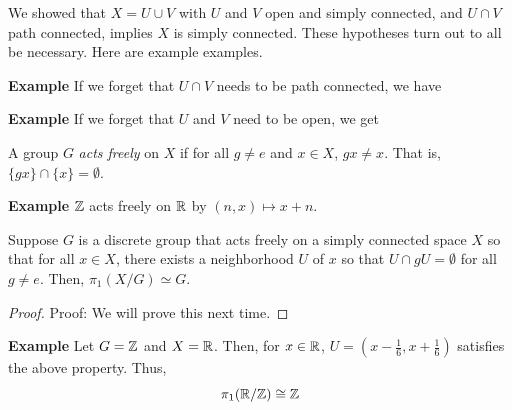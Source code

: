 We showed that $X = U \cup V$ with $U$ and $V$ open and simply connected, and $U \cap V$ path connected, implies $X$ is simply connected. These hypotheses turn out to all be necessary. Here are example examples.

\begin{example}{\textbf{Example}}
    If we forget that $U \cap V$ needs to be path connected, we have
\end{example}
\clearpage

\begin{example}{\textbf{Example}}
    If we forget that $U$ and $V$ need to be open, we get
\end{example}

\begin{definition}
    A group $G$ \emph{acts freely} on $X$ if for all $g \neq e$ and $x \in X$, $gx \neq x$. That is, $\{gx\} \cap \{x\} = \emptyset$.
\end{definition}

\begin{example}{\textbf{Example}}
    $\mathbb{Z}$ acts freely on $\mathbb{R}$ by $(n, x) \mapsto x + n$.
\end{example}

\begin{lemma}
    Suppose $G$ is a discrete group that acts freely on a simply connected space $X$ so that for all $x \in X$, there exists a neighborhood $U$ of $x$ so that $U \cap gU = \emptyset$ for all $g \neq e$. Then, $\pi_1(X / G) \simeq G$.
\end{lemma}
\begin{proof}{Proof:}
    We will prove this next time.
\end{proof}

\begin{example}{\textbf{Example}}
    Let $G = \mathbb{Z}$ and $X = \mathbb{R}$. Then, for $x \in \mathbb{R}$, $U = (x - \frac{1}{6}, x + \frac{1}{6})$ satisfies the above property. Thus,
    \[ \pi_1(\mathbb{R} / \mathbb{Z}) \cong \mathbb{Z} \]
\end{example}
